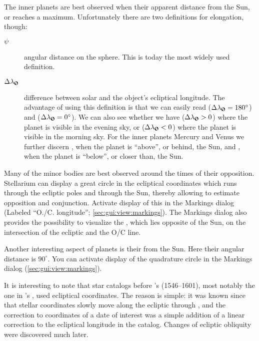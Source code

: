 The inner planets are best observed when their apparent distance from
the Sun, or  reaches a maximum. Unfortunately
there are two definitions for elongation, though:
\begin{description}
\item[$\psi$] angular distance on the sphere. This is today the most widely used definition.
\item[$\Delta\lambda_{\text{\Sun}}$] difference between solar and the
  object's ecliptical longitude. The advantage of using this
  definition is that we can easily read 
  ($\Delta\lambda_{\text{\Sun}}=180^\circ$) and 
  ($\Delta\lambda_{\text{\Sun}}=0^\circ$). We can also see whether we have
   ($\Delta\lambda_{\text{\Sun}}>0$) where the planet is visible in the evening sky, or
   ($\Delta\lambda_{\text{\Sun}}<0$) where the planet is visible in the morning sky.
  For the inner planets Mercury and Venus
  we further discern , when the planet is ``above'', or behind, the Sun,
  and , when
  the planet is ``below'', or closer than, the Sun.
\end{description}


Many of the minor bodies are best observed around the times of their
opposition.  Stellarium can display a great circle in the ecliptical
coordinates which runs through the ecliptic poles and through the Sun,
thereby allowing to estimate opposition and conjunction. Activate
display of this  in the Markings dialog
(Labeled ``O./C. longitude''; \ref{sec:gui:view:markings}). 
The Markings dialog also provides the possibility to visualize the ,
which lies opposite of the Sun, on the intersection of the ecliptic and the O/C line.

Another interesting aspect of planets is their 
from the Sun.  Here their angular distance is $90^\circ$.  You can
activate display of the quadrature circle in the Markings dialog
(\ref{sec:gui:view:markings}).

It is interesting to note that star catalogs before 's 
(1546--1601), most notably the one in 's
, used ecliptical coordinates. The reason is
simple: it was known since  that stellar coordinates
slowly move along the ecliptic through , and the
correction to coordinates of a date of interest was a simple addition
of a linear correction to the ecliptical longitude in the
catalog. Changes of ecliptic obliquity were discovered much later.

